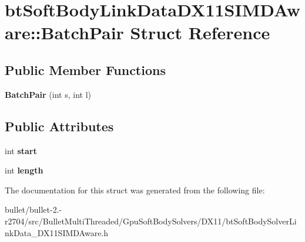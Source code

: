 \hypertarget{structbt_soft_body_link_data_d_x11_s_i_m_d_aware_1_1_batch_pair}{\section{bt\+Soft\+Body\+Link\+Data\+D\+X11\+S\+I\+M\+D\+Aware\+:\+:Batch\+Pair Struct Reference}
\label{structbt_soft_body_link_data_d_x11_s_i_m_d_aware_1_1_batch_pair}
}
\subsection*{Public Member Functions}
\begin{DoxyCompactItemize}
\item 
\hypertarget{structbt_soft_body_link_data_d_x11_s_i_m_d_aware_1_1_batch_pair_aa804043d075029a569fcbb631fe5e1e4}{{\bfseries Batch\+Pair} (int s, int l)}\label{structbt_soft_body_link_data_d_x11_s_i_m_d_aware_1_1_batch_pair_aa804043d075029a569fcbb631fe5e1e4}

\end{DoxyCompactItemize}
\subsection*{Public Attributes}
\begin{DoxyCompactItemize}
\item 
\hypertarget{structbt_soft_body_link_data_d_x11_s_i_m_d_aware_1_1_batch_pair_af2142ea39e1edddc47ff4ccabc6e83a7}{int {\bfseries start}}\label{structbt_soft_body_link_data_d_x11_s_i_m_d_aware_1_1_batch_pair_af2142ea39e1edddc47ff4ccabc6e83a7}

\item 
\hypertarget{structbt_soft_body_link_data_d_x11_s_i_m_d_aware_1_1_batch_pair_a20d85ec76a52d3d8c8f1caf18c6beb4d}{int {\bfseries length}}\label{structbt_soft_body_link_data_d_x11_s_i_m_d_aware_1_1_batch_pair_a20d85ec76a52d3d8c8f1caf18c6beb4d}

\end{DoxyCompactItemize}


The documentation for this struct was generated from the following file\+:\begin{DoxyCompactItemize}
\item 
bullet/bullet-\/2.-\/r2704/src/\+Bullet\+Multi\+Threaded/\+Gpu\+Soft\+Body\+Solvers/\+D\+X11/bt\+Soft\+Body\+Solver\+Link\+Data\+\_\+\+D\+X11\+S\+I\+M\+D\+Aware.\+h\end{DoxyCompactItemize}
